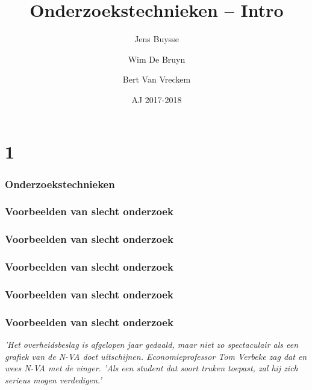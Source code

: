 \documentclass{beamer}
\title[Intro]{Onderzoekstechnieken -- Intro}
\author{Jens Buysse \and Wim {De Bruyn} \and Bert {Van Vreckem}}
\date{AJ 2017-2018}
\begin{document}

\HoGentLogo

\titleframe


\section{1}


\begin{frame}
  \frametitle{Onderzoekstechnieken}

\end{frame}

\begin{frame}
  \frametitle{Voorbeelden van slecht onderzoek}

\end{frame}

\begin{frame}
  \frametitle{Voorbeelden van slecht onderzoek}

\end{frame}

\begin{frame}
  \frametitle{Voorbeelden van slecht onderzoek}

\end{frame}

\begin{frame}
  \frametitle{Voorbeelden van slecht onderzoek}

\end{frame}

\begin{frame}
	\frametitle{Voorbeelden van slecht onderzoek}
	{\tiny \textit{'Het overheidsbeslag is afgelopen jaar gedaald, maar niet zo spectaculair als een grafiek van de N-VA doet uitschijnen. Economieprofessor Tom Verbeke zag dat en wees N-VA met de vinger. 'Als een student dat soort truken toepast, zal hij zich serieus mogen verdedigen.'} }
\end{frame}
\end{document}
